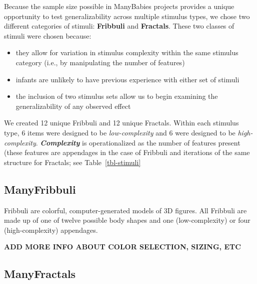 \documentclass[
  letterpaper,
  DIV=11,
  numbers=noendperiod,
  oneside]{scrreprt}
\providecommand{\tightlist}{%
  \setlength{\itemsep}{0pt}\setlength{\parskip}{0pt}}
\begin{document}
Because the sample size possible in ManyBabies projects provides a
unique opportunity to test generalizability across multiple stimulus
types, we chose two different categories of stimuli:
\textbf{Fribbuli} and \textbf{Fractals}. These two classes of stimuli were
chosen because:

\begin{itemize}
\tightlist
\item
  they allow for variation in stimulus complexity within the same
  stimulus category (i.e., by manipulating the number of features)
\item
  infants are unlikely to have previous experience with either set of
  stimuli
\item
  the inclusion of two stimulus sets allow us to begin examining the
  generalizability of any observed effect
\end{itemize}

We created 12 unique Fribbuli and 12 unique Fractals. Within each
stimulus type, 6 items were designed to be \emph{low-complexity} and 6
were designed to be \emph{high-complexity}. \textbf{\emph{Complexity}}
is operationalized as the number of features present (these features are
appendages in the case of Fribbuli and iterations of the same structure
for Fractals; see Table~\ref{tbl-stimuli}

\subsection[ManyFribbuli]{\texorpdfstring{ManyFribbuli}{ManyFribbuli}}\label{manyfribbulistimuli-3}

Fribbuli are colorful, computer-generated models of 3D figures. All
Fribbuli are made up of one of twelve possible body shapes and one
(low-complexity) or four (high-complexity) appendages.

\textbf{ADD MORE INFO ABOUT COLOR SELECTION, SIZING, ETC}

\subsection{ManyFractals}\label{manyfractals}
\end{document}
